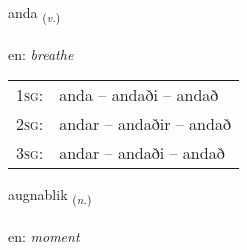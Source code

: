 \documentclass[frontgrid, backgrid]{flacards}\usepackage[]{graphicx}\usepackage[]{xcolor}
\begin{document}
\renewcommand{\blhead}{\vskip5pt {\small\bfseries\footnotesize Sagnorð | Verb }}
\renewcommand{\bcfoot}{\vskip5pt \hspace{2pt}{\small\bfseries\footnotesize 3K}}


{anda \small{\textsubscript{(\textit{v.})}} \\[1ex] %
\textphonetic{[anta]} \\
en: \emph{breathe} \\  [2ex]
\renewcommand*{\arraystretch}{0.8}
\begin{tabular}{p{1cm}l}
\textsc{1sg}: & anda -- andaði -- andað \\ 
\textsc{2sg}: & andar -- andaðir -- andað \\ 
\textsc{3sg}: & andar -- andaði -- andað \\ 
\end{tabular}
}

\renewcommand{\flhead}{\vskip5pt \fboxsep=0pt {\small\bfseries\footnotesize Nafnorð | Noun}}
\renewcommand{\fcfoot}{\vskip5pt \fboxsep=0pt \hspace{2pt}{\small\bfseries\footnotesize 3K}}

\renewcommand{\blhead}{\vskip5pt {\small\bfseries\footnotesize Nafnorð | Noun }}
\renewcommand{\bcfoot}{\vskip5pt \hspace{2pt}{\small\bfseries\footnotesize 3K}}


{augnablik \small{\textsubscript{(\textit{n.})}} \\[1ex] %
\textphonetic{[œiknaplɪk]} \\
en: \emph{moment} \\  [2ex]
\renewcommand*{\arraystretch}{0.8}
}

\renewcommand{\flhead}{\vskip5pt \fboxsep=0pt {\small\bfseries\footnotesize Nafnorð | Noun}}
\renewcommand{\fcfoot}{\vskip5pt \fboxsep=0pt \hspace{2pt}{\small\bfseries\footnotesize 3K}}
\end{document}
